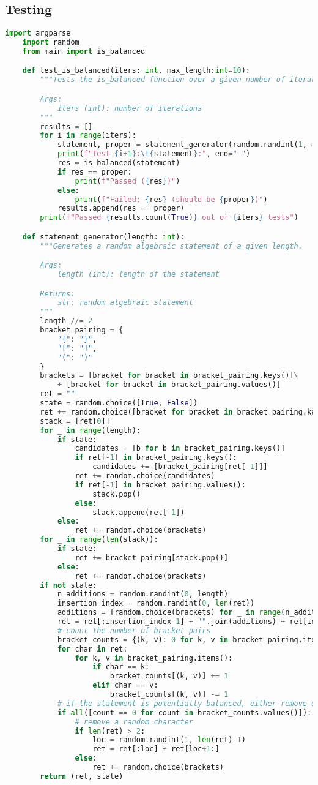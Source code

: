 \documentclass{report}
\begin{document}
\subsection{Testing}
\begin{lstlisting}[language=Python]
	import argparse
	import random
	from main import is_balanced

	def test_is_balanced(iters: int, max_length:int=10):
		"""Tests the is_balanced function over a given number of iterations.

		Args:
			iters (int): number of iterations
		"""
		results = []
		for i in range(iters):
			statement, proper = statement_generator(random.randint(1, max_length))
			print(f"Test {i+1}:\t{statement}:", end=" ")
			res = is_balanced(statement)
			if res == proper:
				print(f"Passed ({res})")
			else:
				print(f"Failed: {res} (should be {proper})")
			results.append(res == proper)
		print(f"Passed {results.count(True)} out of {iters} tests")

	def statement_generator(length: int):
		"""Generates a random algebraic statement of a given length.

		Args:
			length (int): length of the statement

		Returns:
			str: random algebraic statement
		"""
		length //= 2
		bracket_pairing = {
			"{": "}",
			"[": "]",
			"(": ")"
		}
		brackets = [bracket for bracket in bracket_pairing.keys()]\
			+ [bracket for bracket in bracket_pairing.values()]
		ret = ""
		state = random.choice([True, False])
		ret += random.choice([bracket for bracket in bracket_pairing.keys()])
		stack = [ret[0]]
		for _ in range(length):
			if state:
				candidates = [b for b in bracket_pairing.keys()]
				if ret[-1] in bracket_pairing.keys():
					candidates += [bracket_pairing[ret[-1]]]
				ret += random.choice(candidates)
				if ret[-1] in bracket_pairing.values():
					stack.pop()
				else:
					stack.append(ret[-1])
			else:
				ret += random.choice(brackets)
		for _ in range(len(stack)):
			if state:
				ret += bracket_pairing[stack.pop()]
			else:
				ret += random.choice(brackets)
		if not state:
			n_additions = random.randint(0, length)
			insertion_index = random.randint(0, len(ret))
			additions = [random.choice(brackets) for _ in range(n_additions)]
			ret = ret[:insertion_index-1] + "".join(additions) + ret[insertion_index+1:len(ret)+1-n_additions]
			# count the number of bracket pairs
			bracket_counts = {(k, v): 0 for k, v in bracket_pairing.items()}
			for char in ret:
				for k, v in bracket_pairing.items():
					if char == k:
						bracket_counts[(k, v)] += 1
					elif char == v:
						bracket_counts[(k, v)] -= 1
			# if the statement is potentially balanced, either remove or add a random character.
			if all([count == 0 for count in bracket_counts.values()]):
				# remove a random character
				if len(ret) > 2:
					loc = random.randint(1, len(ret)-1)
					ret = ret[:loc] + ret[loc+1:]
				else:
					ret += random.choice(brackets)
		return (ret, state)


\end{lstlisting}
\end{document}

